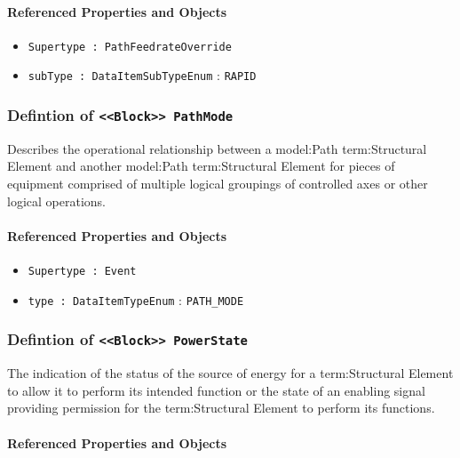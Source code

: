 \FloatBarrier
\paragraph{Referenced Properties and Objects}

\begin{itemize}
\item \texttt{Supertype : PathFeedrateOverride}

\item \texttt{subType : DataItemSubTypeEnum} : \texttt{RAPID}

\end{itemize}
\FloatBarrier
\subsubsection{Defintion of \texttt{<<Block>> PathMode}}
  \label{type:PathMode}

\FloatBarrier

Describes the operational relationship between a {model:Path} {term:Structural Element} and another {model:Path} {term:Structural Element} for pieces of equipment comprised of multiple logical groupings of controlled axes or other logical operations.

\FloatBarrier
\paragraph{Referenced Properties and Objects}

\begin{itemize}
\item \texttt{Supertype : Event}

\item \texttt{type : DataItemTypeEnum} : \texttt{PATH_MODE}

\end{itemize}
\FloatBarrier
\subsubsection{Defintion of \texttt{<<Block>> PowerState}}
  \label{type:PowerState}

\FloatBarrier

The indication of the status of the source of energy for a {term:Structural Element} to allow it to perform its intended function or the state of an enabling signal providing permission for the {term:Structural Element} to perform its functions.

\FloatBarrier
\paragraph{Referenced Properties and Objects}

